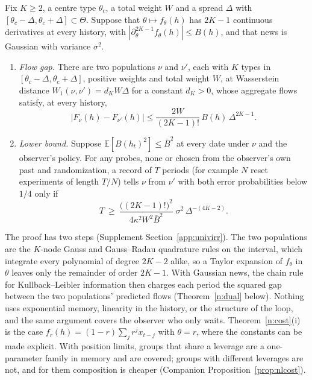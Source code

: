 \begin{theorem}\label{n:univ}
Fix $K\ge2$, a centre type $\theta_c$, a total weight $W$ and a spread $\Delta$ with $[\theta_c-\Delta,\theta_c+\Delta]\subset\Theta$. Suppose that $\theta\mapsto f_\theta(h)$ has $2K-1$ continuous derivatives at every history, with $|\partial_\theta^{2K-1}f_\theta(h)|\le B(h)$, and that news is Gaussian with variance $\sigma^2$.
\begin{enumerate}[label=(\roman*),itemsep=1pt]
\item \emph{Flow gap.} There are two populations $\nu$ and $\nu'$, each with $K$ types in $[\theta_c-\Delta,\theta_c+\Delta]$, positive weights and total weight $W$, at Wasserstein distance $W_1(\nu,\nu')=d_KW\Delta$ for a constant $d_K>0$, whose aggregate flows satisfy, at every history,
\[
|F_\nu(h)-F_{\nu'}(h)|\le\frac{2W}{(2K-1)!}\,B(h)\,\Delta^{2K-1}.
\]
\item \emph{Lower bound.} Suppose $\mathbb E[B(h_t)^2]\le\bar B^2$ at every date under $\nu$ and the observer's policy. For any probes, none or chosen from the observer's own past and randomization, a record of $T$ periods (for example $N$ reset experiments of length $T/N$) tells $\nu$ from $\nu'$ with both error probabilities below $1/4$ only if
\[
T\ \ge\ \frac{\big((2K-1)!\big)^2}{4\kappa^2W^2\bar B^2}\;\sigma^2\,\Delta^{-(4K-2)}.
\]
\end{enumerate}
\end{theorem}

The proof has two steps (Supplement Section~\ref{app:univirr}). The two populations are the $K$-node Gauss and Gauss--Radau quadrature rules on the interval, which integrate every polynomial of degree $2K-2$ alike, so a Taylor expansion of $f_\theta$ in $\theta$ leaves only the remainder of order $2K-1$. With Gaussian news, the chain rule for Kullback--Leibler information then charges each period the squared gap between the two populations' predicted flows (Theorem~\ref{n:dual} below). Nothing uses exponential memory, linearity in the history, or the structure of the loop, and the same argument covers the observer who only waits. Theorem~\ref{n:cost}(i) is the case $f_r(h)=(1-r)\sum_jr^jx_{t-j}$ with $\theta=r$, where the constants can be made explicit. With position limits, groups that share a leverage are a one-parameter family in memory and are covered; groups with different leverages are not, and for them composition is cheaper (Companion Proposition~\ref{prop:nlcost}).

